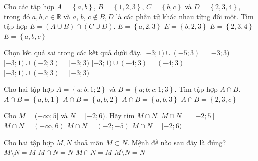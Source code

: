 \begin{ex}%
	Cho các tập hợp $A=\left\{a,b\right\}$, $B=\left\{1,2,3\right\}$, $C=\left\{b,c\right\}$ và $D=\left\{2,3,4\right\}$, trong đó $a, b, c\in\mathbb{R}$ và $a$, $b$, $c\notin B,D$ là các phần  tử khác nhau từng đôi một. Tìm tập hợp $E=\left(A\cup B\right)\cap\left(C\cup D\right)$.
	\choice 
		{$E=\left\{a,2,3\right\}$} 
		 {\True $E=\left\{b,2,3\right\}$}
		 {$E=\left\{2,3,4\right\}$}
		 {$E=\left\{a,b,c\right\}$}
\end{ex}

\begin{ex}%
	Chọn kết quả  sai trong các kết quả dưới đây.
	 \choice
		{\True $[-3; 1)  \cup(-5; 3)=[-3; 3)$}
		{$[-3;  1) \cup(-2; 3)=[-3; 3)$}
		{$[-3; 1)  \cup(-4; 3)=(-4; 3)$}
		{$[-3; 1)  \cup(-3; 3)=[-3; 3)$}
	 \loigiai{
		$[-3; 1)  \cup(-5; 3)=[-5; 3)$
	} 
\end{ex}

\begin{ex}%
	Cho hai tập hợp $A=\left\{a; b; 1;  2\right\}$ và $B=\left\{a; b; c; 1; 3\right\}.$ Tìm tập hợp $A\cap B.$
	\choice 
		{\True  $A\cap B=\left\{a,b,1\right\}$}
		{$A\cap  B=\left\{a,b,2\right\}$}
		{$A\cap B=\left\{a,b,3\right\}$} 
		{$A\cap B=\left\{2,3,c\right\}$} 
\end{ex}

\begin{ex}%
	Cho $M=(-\infty; 5]$ và $N=[-2; 6)$. Hãy  tìm $M \cap N$.
	 \choice
		 {\True $M \cap N=[-2; 5]$}
		{$M  \cap N=(-\infty, 6)$}
		{$M \cap N=(-2;-5)$} 
		{$M \cap  N=[-2; 6)$}
\end{ex}

\begin{ex}%
	Cho hai tập hợp $M,N$ thoả mãn $M \subset N$. Mệnh đề nào sau đây là  đúng?
	 \choice
		 {$M \setminus N=M$}
		{\True $M \cap  N=N$}
		{$M \cap N=M$} 
		{$M  \setminus N=N$}
\end{ex}

